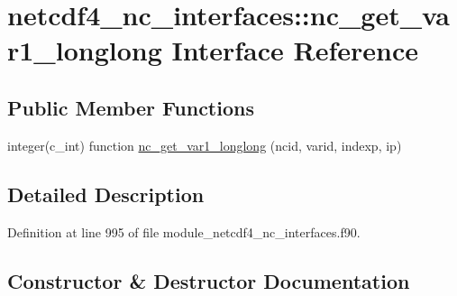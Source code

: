 \hypertarget{interfacenetcdf4__nc__interfaces_1_1nc__get__var1__longlong}{}\section{netcdf4\+\_\+nc\+\_\+interfaces\+:\+:nc\+\_\+get\+\_\+var1\+\_\+longlong Interface Reference}
\label{interfacenetcdf4__nc__interfaces_1_1nc__get__var1__longlong}
\subsection*{Public Member Functions}
\begin{DoxyCompactItemize}
\item 
integer(c\+\_\+int) function \hyperlink{interfacenetcdf4__nc__interfaces_1_1nc__get__var1__longlong_a444aec9fd0d332925b9327aad824b8d5}{nc\+\_\+get\+\_\+var1\+\_\+longlong} (ncid, varid, indexp, ip)
\end{DoxyCompactItemize}


\subsection{Detailed Description}


Definition at line 995 of file module\+\_\+netcdf4\+\_\+nc\+\_\+interfaces.\+f90.



\subsection{Constructor \& Destructor Documentation}
\mbox{\label{interfacenetcdf4__nc__interfaces_1_1nc__get__var1__longlong_a444aec9fd0d332925b9327aad824b8d5}} 

